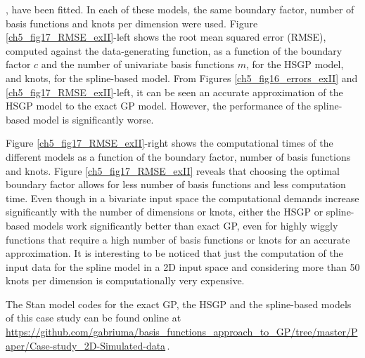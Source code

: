 \documentclass[onecolumn,a4paper,11pt]{article}
\begin{document}
, have been fitted. In each of these models, the same boundary factor, number of basis functions and knots per dimension were used. Figure \ref{ch5_fig17_RMSE_exII}-left shows the root mean squared error (RMSE), computed against the data-generating function, as a function of the boundary factor $c$ and the number of univariate basis functions $m$, for the HSGP model, and knots, for the spline-based model. From Figures \ref{ch5_fig16_errors_exII} and \ref{ch5_fig17_RMSE_exII}-left, it can be seen an accurate approximation of the HSGP model to the exact GP model. However, the performance of the spline-based model is significantly worse. 

Figure \ref{ch5_fig17_RMSE_exII}-right shows the computational times of the different models as a function of the boundary factor, number of basis functions and knots. Figure \ref{ch5_fig17_RMSE_exII} reveals that choosing the optimal boundary factor allows for less number of basis functions and less computation time. Even though in a bivariate input space the computational demands increase significantly with the number of dimensions or knots, either the HSGP or spline-based models work significantly better than exact GP, even for highly wiggly functions that require a high number of basis functions or knots for an accurate approximation. It is interesting to be noticed that just the computation of the input data for the spline model in a 2D input space and considering more than 50 knots per dimension is computationally very expensive.

The Stan model codes for the exact GP, the HSGP and the spline-based models of this case study can be found online at {\small \url{https://github.com/gabriuma/basis_functions_approach_to_GP/tree/master/Paper/Case-study_2D-Simulated-data}}\,.
\end{document}
